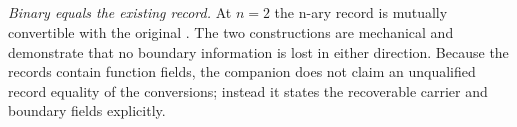 \documentclass[11pt]{article}
\begin{document}
\begin{code}
\<%
\\
\>[2][@{}l@{\AgdaIndent{0}}]%
\>[4]\AgdaSymbol{(}\AgdaSpace{}%
\AgdaSymbol{(}\AgdaSpace{}%
\AgdaSymbol{)}\AgdaSpace{}%
\AgdaSymbol{(}\AgdaSpace{}%
\AgdaSymbol{)}\<%
\\
\>[4][@{}l@{\AgdaIndent{0}}]%
\>[6]\AgdaSymbol{(}\AgdaSpace{}%
\<%
\\
\>[6][@{}l@{\AgdaIndent{0}}]%
\>[8]\AgdaSymbol{(}\AgdaSpace{}%
\AgdaSymbol{(}\AgdaSpace{}%
\AgdaSymbol{))}\<%
\\
%
\>[8]\AgdaSymbol{(}\AgdaSpace{}%
\AgdaSymbol{(}\AgdaSpace{}%
\AgdaSymbol{))))}\<%
\end{code}

\emph{Binary equals the existing record.}  At $n=2$ the n-ary record
is mutually convertible with the original .
The two constructions are mechanical and demonstrate that no boundary
information is lost in either direction.  Because the records contain
function fields, the companion does not claim an unqualified record
equality of the conversions; instead it states the recoverable carrier
and boundary fields explicitly.
\end{document}
